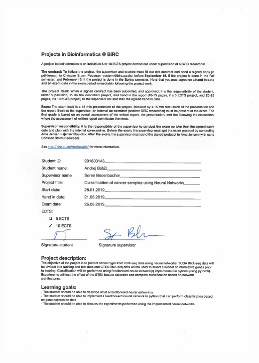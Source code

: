 \documentclass[12pt,oneside]{book}
\begin{document}
\newpage 
\thispagestyle{empty}
\hspace{-2cm}\includegraphics[width=1.1\textwidth]{images/contract.pdf}

\setcounter{page}{3}
% 

% 

\newpage 
\tableofcontents

\newpage 
\listoffigures

\mainmatter

 
%





\newpage	
\backmatter
\thispagestyle{empty}
\nocite{*}
\clearpage


 
\end{document}
